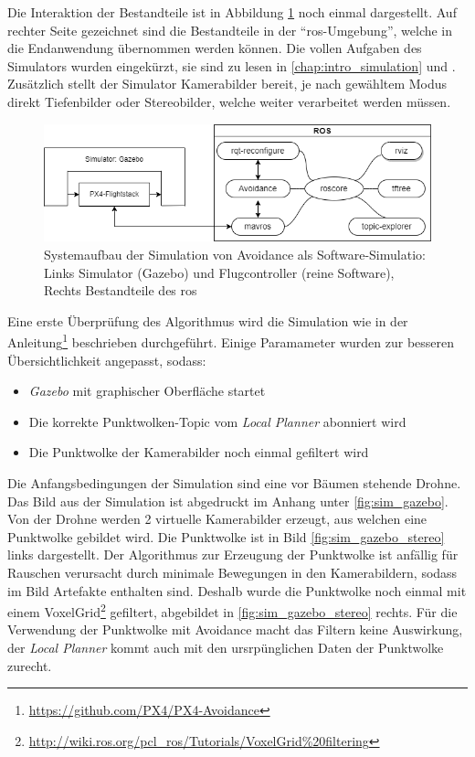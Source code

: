 Die Interaktion der Bestandteile ist in Abbildung \ref{fig:system_sim_origin} noch einmal dargestellt. Auf rechter Seite gezeichnet sind die Bestandteile in der \enquote{\acrshort{ros}-Umgebung}, welche in die Endanwendung übernommen werden können. Die vollen Aufgaben des Simulators wurden eingekürzt, sie sind zu lesen in \cref{chap:intro_simulation} und \cite[Kapitel 3.4.1]{markusreinErweiterungBestehenderDrohnen2023}. Zusätzlich stellt der Simulator Kamerabilder bereit, je nach gewähltem Modus direkt Tiefenbilder oder Stereobilder, welche weiter verarbeitet werden müssen. 
\begin{figure}[!ht]
    \centering
    \includegraphics[width=\linewidth]{images/simulation_ros.drawio.png}
    \caption[Systemaufbau der Simulation von Avoidance als Software-Simulation]{Systemaufbau der Simulation von Avoidance als Software-Simulatio: Links Simulator (Gazebo) und Flugcontroller (reine Software), Rechts Bestandteile des \acrshort{ros}}
    \label{fig:system_sim_origin}
\end{figure}

Eine erste Überprüfung des Algorithmus wird die Simulation wie in der Anleitung\footnote{\url{https://github.com/PX4/PX4-Avoidance}\cite{dronecodestiftungObstacleDetectionAvoidance2023}} beschrieben durchgeführt. Einige Paramameter wurden zur besseren Übersichtlichkeit angepasst, sodass:
\begin{itemize}
    \item \textit{Gazebo} mit graphischer Oberfläche startet
    \item Die korrekte Punktwolken-Topic vom \textit{Local Planner} abonniert wird
    \item Die Punktwolke der Kamerabilder noch einmal gefiltert wird
\end{itemize} 

Die Anfangsbedingungen der Simulation sind eine vor Bäumen stehende Drohne. Das Bild aus der Simulation ist abgedruckt im Anhang unter \ref{fig:sim_gazebo}. Von der Drohne werden 2 virtuelle Kamerabilder erzeugt, aus welchen eine Punktwolke gebildet wird. Die Punktwolke ist in Bild \ref{fig:sim_gazebo_stereo} links dargestellt. Der Algorithmus zur Erzeugung der Punktwolke ist anfällig für Rauschen verursacht durch minimale Bewegungen in den Kamerabildern, sodass im Bild Artefakte enthalten sind. Deshalb wurde die Punktwolke noch einmal mit einem VoxelGrid\footnote{\url{http://wiki.ros.org/pcl_ros/Tutorials/VoxelGrid\%20filtering}\cite{openroboticsDocumentationROSWiki}} gefiltert, abgebildet in \ref{fig:sim_gazebo_stereo} rechts. Für die Verwendung der Punktwolke mit Avoidance macht das Filtern keine Auswirkung, der \textit{Local Planner} kommt auch mit den ursrpünglichen Daten der Punktwolke zurecht.


